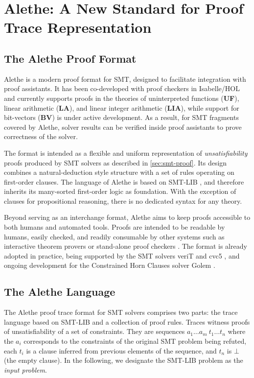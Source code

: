 \chapter{Alethe: A New Standard for Proof Trace Representation}\label{ch:alethe}

\section{The Alethe Proof Format}

Alethe \cite{alethe,alethe2} is a modern proof format for SMT, designed to facilitate integration with proof assistants.
It has been co-developed with proof checkers in Isabelle/HOL \cite{aletheInIsa} and currently supports proofs in the theories of uninterpreted functions (\textbf{UF}), linear arithmetic (\textbf{LA}), and linear integer arithmetic (\textbf{LIA}), while support for bit-vectors (\textbf{BV}) is under active development.
As a result, for SMT fragments covered by Alethe, solver results can be verified inside proof assistants to prove correctness of the solver.

The format is intended as a flexible and uniform representation of \emph{unsatisfiability} proofs produced by SMT solvers as described in \cref{sec:smt-proof}.
Its design combines a natural-deduction style structure with a set of rules operating on first-order clauses.
The language of Alethe is based on SMT-LIB \cite{smtlib}, and therefore inherits its many-sorted first-order logic as foundation.
With the exception of clauses for propositional reasoning, there is no dedicated syntax for any theory.

Beyond serving as an interchange format, Alethe aims to keep proofs accessible to both humans and automated tools.
Proofs are intended to be readable by humans, easily checked, and readily consumable by other systems such as interactive theorem provers or stand-alone proof checkers \cite{carcara}.
The format is already adopted in practice, being supported by the SMT solvers veriT \cite{verit} and cvc5 \cite{cvc5}, and ongoing development for the Constrained Horn Clauses solver Golem \cite{golem}.

\section{The Alethe Language}

The Alethe proof trace format \cite{alethespec} for SMT solvers comprises two parts: the trace language based on SMT-LIB and a collection of proof rules. Traces witness proofs of unsatisfiability of a set of constraints.
They are sequences $a_1 \dots a_m~t_1 \dots t_n$ where
the $a_i$ corresponds to the constraints of the original SMT problem being refuted, each $t_i$ is a clause inferred from previous elements of the sequence, and $t_n$ is $\bot$ (the empty clause).
In the following, we designate the SMT-LIB problem as the \emph{input problem}.

